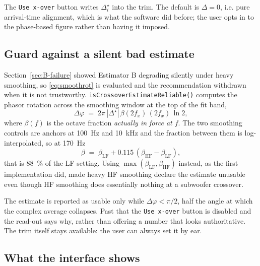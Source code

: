 \documentclass[11pt,a4paper]{article}
\newcommand{\code}[1]{\texttt{\small #1}}
\begin{document}
The \code{Use x-over} button writes $\Delta_i^\star$ into the trim. The default
is $\Delta = 0$, i.e. pure arrival-time alignment, which is what the software did
before; the user opts in to the phase-based figure rather than having it imposed.

\subsection{Guard against a silent bad estimate}

Section~\ref{sec:B-failure} showed Estimator B degrading silently under heavy
smoothing, so \eqref{eq:smoothrot} is evaluated and the recommendation withdrawn
when it is not trustworthy. \code{isCrossoverEstimateReliable()} computes the
phasor rotation across the smoothing window at the top of the fit band,
%
\begin{equation}
  \Delta\varphi \;=\; 2\pi\,|\Delta^\star|\,\beta(2 f_x)\,(2 f_x)\,\ln 2 ,
\end{equation}
%
where $\beta(f)$ is the octave fraction \emph{actually in force at $f$}. The two
smoothing controls are anchors at \SI{100}{\hertz} and \SI{10}{\kilo\hertz} and
the fraction between them is log-interpolated, so at \SI{170}{\hertz}
%
\begin{equation}
  \beta \;=\; \beta_{\mathrm{LF}} + 0.115\,(\beta_{\mathrm{HF}} - \beta_{\mathrm{LF}}),
\end{equation}
%
that is \SI{88}{\percent} of the LF setting. Using
$\max(\beta_{\mathrm{LF}}, \beta_{\mathrm{HF}})$ instead, as the first
implementation did, made heavy HF smoothing declare the estimate unusable even
though HF smoothing does essentially nothing at a subwoofer crossover.

The estimate is reported as usable only while $\Delta\varphi < \pi/2$, half the
angle at which the complex average collapses. Past that the \code{Use x-over}
button is disabled and the read-out says why, rather than offering a number that
looks authoritative. The trim itself stays available: the user can always set it
by ear.

\subsection{What the interface shows}
\end{document}
